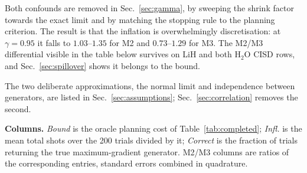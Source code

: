 \documentclass[10pt]{article}
\begin{document}
Both confounds are removed in Sec.~\ref{sec:gamma}, by sweeping the shrink factor
towards the exact limit and by matching the stopping rule to the planning
criterion. The result is that the inflation is overwhelmingly discretisation: at
$\gamma=0.95$ it falls to $1.03$--$1.35$ for M2 and $0.73$--$1.29$ for M3. The
M2/M3 differential visible in the table below survives on LiH and both H$_2$O CISD
rows, and Sec.~\ref{sec:spillover} shows it belongs to the bound.

The two deliberate approximations, the normal limit and independence between
generators, are listed in Sec.~\ref{sec:assumptions};
Sec.~\ref{sec:correlation} removes the second.

\textbf{Columns.} \emph{Bound} is the oracle planning cost of
Table~\ref{tab:completed}; \emph{Infl.} is the mean total shots over the 200
trials divided by it; \emph{Correct} is the fraction of trials returning the true
maximum-gradient generator. M2/M3 columns are ratios of the corresponding
entries, standard errors combined in quadrature.
\end{document}
